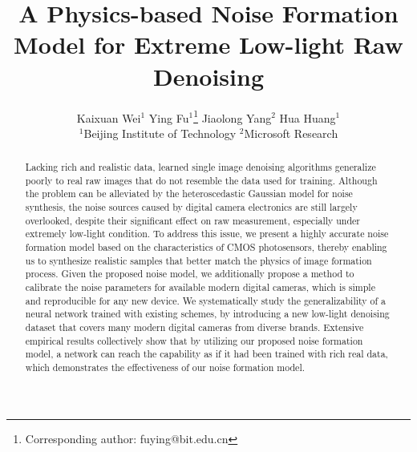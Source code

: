 \documentclass[10pt,twocolumn,letterpaper]{article}
\begin{document}
\title{A Physics-based Noise Formation Model for Extreme Low-light Raw Denoising}

\author{Kaixuan Wei$^1$  \quad Ying Fu$^1$\footnote{Corresponding author: fuying@bit.edu.cn} \quad Jiaolong Yang$^2$  \quad Hua Huang$^1$
\\ $^1$Beijing Institute of Technology \quad $^2$Microsoft  Research\\
}

\maketitle

\begin{abstract}
  Lacking rich and realistic data, learned single image denoising algorithms
  generalize poorly to real raw images that do not resemble the data used for
  training. Although the problem can be alleviated by the
  heteroscedastic Gaussian model for noise synthesis, the noise sources caused by digital
  camera electronics are still largely overlooked, despite their significant effect on
  raw measurement, especially under extremely low-light condition. To address
  this issue, we present a highly accurate noise formation model based on the
  characteristics of CMOS photosensors, thereby enabling us to synthesize
  realistic samples that better match the physics of image formation process.
  Given the proposed noise model, we additionally propose a
  method to calibrate the noise parameters for available modern digital
  cameras, which is simple and reproducible for any new device. We
  systematically study the generalizability of a neural network trained with
  existing schemes, by introducing a new low-light denoising dataset that covers
  many modern digital cameras from diverse brands. Extensive empirical results
  collectively show that by utilizing our proposed noise formation model, a
  network can reach the capability as if it had been trained with rich real
  data, which demonstrates the effectiveness of our noise formation model.
\end{abstract}
\end{document}
